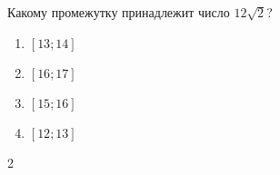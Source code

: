\begin{ex}
	Какому промежутку принадлежит число $12\sqrt{2}$?
	
	\selectanswer
	\begin{multicols}{4}
		\begin{enumerate}[label=\arabic*)]
			\item $[13;14]$
			\item $[16;17]$
			\item $[15;16]$
			\item $[12;13]$
		\end{enumerate}
	\end{multicols}
	\begin{answer}
		2
	\end{answer}
\end{ex}